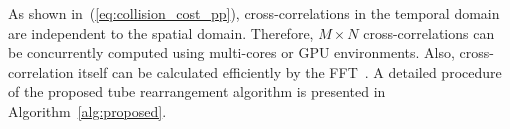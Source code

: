 \documentclass[11pt]{hyu_thesis}
\begin{document}
As shown in~(\ref{eq:collision_cost_pp}), cross-correlations in the temporal domain are independent to the spatial domain. Therefore, $M \times N$ cross-correlations can be concurrently computed using multi-cores or GPU environments. Also, cross-correlation itself can be calculated efficiently by the FFT~\cite{Oppenheim2009}. A detailed procedure of the proposed tube rearrangement algorithm is presented in Algorithm~\ref{alg:proposed}.

\begin{figure}
\centering
{}
\label{fig:sidewalk}
\label{fig:crossroadI}
\label{fig:crossroadII}
\label{fig:library}

\end{figure}
\end{document}
